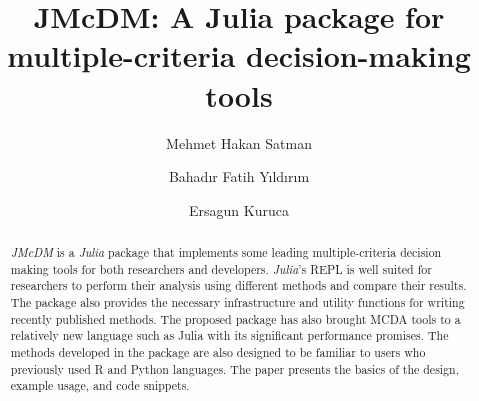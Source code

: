 \documentclass[preprint,review, 12pt, a4paper]{elsarticle}
\begin{document}
\begin{frontmatter}



\title{JMcDM: A Julia package for multiple-criteria decision-making tools}


\author[author1]{Mehmet Hakan Satman}
\author[author2]{Bahadır Fatih Yıldırım}
\author[author3]{Ersagun Kuruca}


\address[author1]{Istanbul University, Department of Econometrics, Beyazit, Istanbul, Turkey}
\address[author2]{Istanbul University, Department of Transportation and Logistics, Avcilar, Istanbul, Turkey}
\address[author3]{Istanbul Technical University, Department of Computer Engineering, Sariyer,  Istanbul, Turkey}





\begin{abstract}
\emph{JMcDM} is a \emph{Julia} package that implements some leading multiple-criteria decision making tools for both researchers and developers. \emph{Julia}'s REPL is well suited for researchers to perform their analysis using different methods and compare their results. The package also provides the necessary infrastructure and utility functions for writing recently published methods.  The proposed package has also brought MCDA tools to a relatively new language such as Julia with its significant performance promises. The methods developed in the package are also designed to be familiar to users who previously used R and Python languages. The paper presents the basics of the design, example usage, and code snippets.


\end{abstract}
\end{frontmatter}
\end{document}
